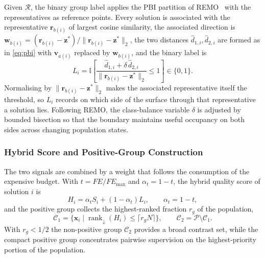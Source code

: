 \documentclass[final,5p,times,twocolumn]{elsarticle}
\newcommand{\vx}{\mathbf{x}}
\newcommand{\vv}{\mathbf{v}}
\newcommand{\vw}{\mathbf{w}}
\newcommand{\vr}{\mathbf{r}}
\newcommand{\vz}{\mathbf{z}}
\begin{document}
Given $\mathcal{R}$, the binary group label applies the PBI partition of
REMO~\cite{ref:remo} with the representatives as reference points. Every
solution is associated with the representative $\vr_{b(i)}$ of largest cosine
similarity, the associated direction is
$\vw_{b(i)}=(\vr_{b(i)}-\vz^{*})/\|\vr_{b(i)}-\vz^{*}\|_2$, the two distances
$\hat d_{1,i},\hat d_{2,i}$ are formed as in \eqref{eq:pbi} with
$\vv_{a(i)}$ replaced by $\vw_{b(i)}$, and the binary label is
\begin{equation}
L_i=\mathbb{I}\!\left[
\frac{\hat d_{1,i}+\delta\,\hat d_{2,i}}
     {\|\vr_{b(i)}-\vz^{*}\|_2}\leq1\right]\in\{0,1\}.
\label{eq:label-bin}
\end{equation}
Normalising by $\|\vr_{b(i)}-\vz^{*}\|_2$ makes the associated representative
itself the threshold, so $L_i$ records on which side of the surface through that
representative a solution lies. Following REMO, the class-balance variable
$\delta$ is adjusted by bounded bisection so that the boundary maintains useful
occupancy on both sides across changing population states.

\subsubsection{Hybrid Score and Positive-Group Construction}
\label{sec:method:hpc:hybrid}

The two signals are combined by a weight that follows the consumption of the
expensive budget. With $t=FE/FE_{\max}$ and $\alpha_t=1-t$, the hybrid quality
score of solution $i$ is
\begin{equation}
H_i=\alpha_t S_i+(1-\alpha_t)L_i ,
\qquad
\alpha_t=1-t ,
\label{eq:fuse}
\end{equation}
and the positive group collects the highest-ranked fraction $r_g$ of the
population,
\begin{equation}
\mathcal{C}_1=\bigl\{\vx_i\;\big|\;
\operatorname{rank}_{\downarrow}(H_i)\leq\lceil r_gN\rceil\bigr\},
\qquad
\mathcal{C}_2=\mathcal{P}\setminus\mathcal{C}_1 .
\label{eq:group}
\end{equation}
With $r_g<1/2$ the non-positive group $\mathcal{C}_2$ provides a broad contrast
set, while the compact positive group concentrates pairwise supervision on the
highest-priority portion of the population.
\end{document}

